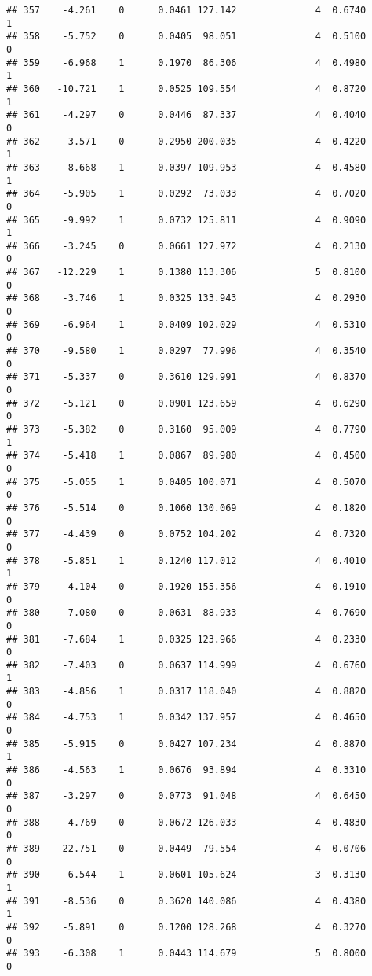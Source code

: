 \documentclass[
]{article}
\begin{document}
\begin{verbatim}
## 357    -4.261    0      0.0461 127.142              4  0.6740      1
## 358    -5.752    0      0.0405  98.051              4  0.5100      0
## 359    -6.968    1      0.1970  86.306              4  0.4980      1
## 360   -10.721    1      0.0525 109.554              4  0.8720      1
## 361    -4.297    0      0.0446  87.337              4  0.4040      0
## 362    -3.571    0      0.2950 200.035              4  0.4220      1
## 363    -8.668    1      0.0397 109.953              4  0.4580      1
## 364    -5.905    1      0.0292  73.033              4  0.7020      0
## 365    -9.992    1      0.0732 125.811              4  0.9090      1
## 366    -3.245    0      0.0661 127.972              4  0.2130      0
## 367   -12.229    1      0.1380 113.306              5  0.8100      0
## 368    -3.746    1      0.0325 133.943              4  0.2930      0
## 369    -6.964    1      0.0409 102.029              4  0.5310      0
## 370    -9.580    1      0.0297  77.996              4  0.3540      0
## 371    -5.337    0      0.3610 129.991              4  0.8370      0
## 372    -5.121    0      0.0901 123.659              4  0.6290      0
## 373    -5.382    0      0.3160  95.009              4  0.7790      1
## 374    -5.418    1      0.0867  89.980              4  0.4500      0
## 375    -5.055    1      0.0405 100.071              4  0.5070      0
## 376    -5.514    0      0.1060 130.069              4  0.1820      0
## 377    -4.439    0      0.0752 104.202              4  0.7320      0
## 378    -5.851    1      0.1240 117.012              4  0.4010      1
## 379    -4.104    0      0.1920 155.356              4  0.1910      0
## 380    -7.080    0      0.0631  88.933              4  0.7690      0
## 381    -7.684    1      0.0325 123.966              4  0.2330      0
## 382    -7.403    0      0.0637 114.999              4  0.6760      1
## 383    -4.856    1      0.0317 118.040              4  0.8820      0
## 384    -4.753    1      0.0342 137.957              4  0.4650      0
## 385    -5.915    0      0.0427 107.234              4  0.8870      1
## 386    -4.563    1      0.0676  93.894              4  0.3310      0
## 387    -3.297    0      0.0773  91.048              4  0.6450      0
## 388    -4.769    0      0.0672 126.033              4  0.4830      0
## 389   -22.751    0      0.0449  79.554              4  0.0706      0
## 390    -6.544    1      0.0601 105.624              3  0.3130      1
## 391    -8.536    0      0.3620 140.086              4  0.4380      1
## 392    -5.891    0      0.1200 128.268              4  0.3270      0
## 393    -6.308    1      0.0443 114.679              5  0.8000      0

\end{verbatim}
\end{document}
